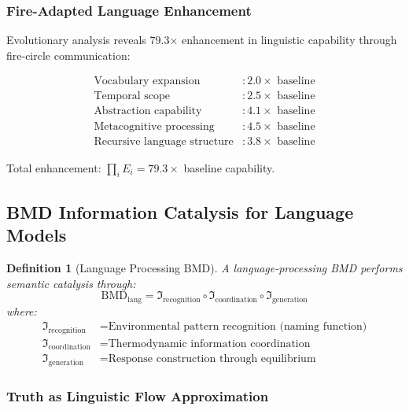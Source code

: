 \documentclass[12pt,a4paper]{article}
\newtheorem{definition}{Definition}
\begin{document}
\subsubsection{Fire-Adapted Language Enhancement}

Evolutionary analysis reveals 79.3× enhancement in linguistic capability through fire-circle communication:

\begin{align}
\text{Vocabulary expansion} &: 2.0\times \text{ baseline} \\
\text{Temporal scope} &: 2.5\times \text{ baseline} \\
\text{Abstraction capability} &: 4.1\times \text{ baseline} \\
\text{Metacognitive processing} &: 4.5\times \text{ baseline} \\
\text{Recursive language structure} &: 3.8\times \text{ baseline}
\end{align}

Total enhancement: $\prod_{i} E_i = 79.3\times$ baseline capability.

\subsection{BMD Information Catalysis for Language Models}

\begin{definition}[Language Processing BMD]
A language-processing BMD performs semantic catalysis through:
\begin{equation}
\text{BMD}_{\text{lang}} = \mathfrak{I}_{\text{recognition}} \circ \mathfrak{I}_{\text{coordination}} \circ \mathfrak{I}_{\text{generation}}
\end{equation}
where:
\begin{align}
\mathfrak{I}_{\text{recognition}} &= \text{Environmental pattern recognition (naming function)} \\
\mathfrak{I}_{\text{coordination}} &= \text{Thermodynamic information coordination} \\
\mathfrak{I}_{\text{generation}} &= \text{Response construction through equilibrium}
\end{align}
\end{definition}

\subsubsection{Truth as Linguistic Flow Approximation}
\end{document}
